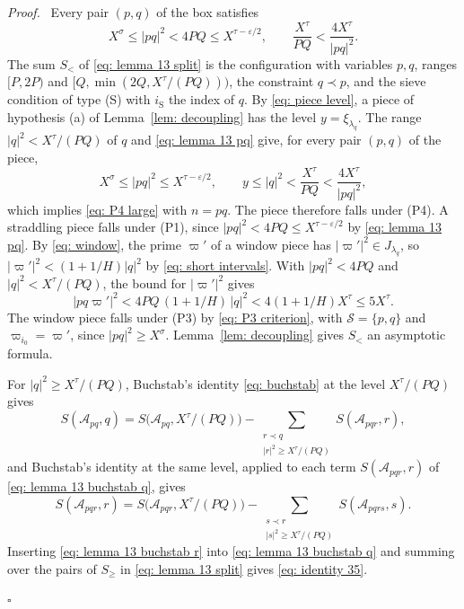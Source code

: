 \documentclass{article}
\numberwithin{equation}{section}
\newenvironment{proof}[1][Proof]{\par\medskip\noindent\textit{#1.}\ }{\hfill$\square$\par\medskip}
\newcommand{\Le}{\leqslant}
\newcommand{\Ge}{\geqslant}
\begin{document}
\begin{proof}
Every pair $(p, q)$ of the box satisfies
\begin{equation}
\label{eq: lemma 13 pq}
X^{\sigma} \Le |pq|^2 < 4PQ \Le X^{\tau - \varepsilon/2}, \qquad \frac{X^{\tau}}{PQ} < \frac{4X^{\tau}}{|pq|^2}.
\end{equation}
The sum $S_<$ of \eqref{eq: lemma 13 split} is the configuration with variables $p, q$, ranges $[P, 2P)$ and $[Q, \min(2Q, X^{\tau}/(PQ)))$, the constraint $q \prec p$, and the sieve condition of type (S) with $i_{\mathrm{S}}$ the index of $q$. By \eqref{eq: piece level}, a piece of hypothesis (a) of Lemma~\ref{lem: decoupling} has the level $y = \xi_{\lambda_q}$. The range $|q|^2 < X^{\tau}/(PQ)$ of $q$ and \eqref{eq: lemma 13 pq} give, for every pair $(p, q)$ of the piece,
\begin{equation*}
X^{\sigma} \Le |pq|^2 \Le X^{\tau - \varepsilon/2}, \qquad y \Le |q|^2 < \frac{X^{\tau}}{PQ} < \frac{4X^{\tau}}{|pq|^2},
\end{equation*}
which implies \eqref{eq: P4 large} with $n = pq$. The piece therefore falls under (P4). A straddling piece falls under (P1), since $|pq|^2 < 4PQ \Le X^{\tau - \varepsilon/2}$ by \eqref{eq: lemma 13 pq}. By \eqref{eq: window}, the prime $\varpi'$ of a window piece has $|\varpi'|^2 \in J_{\lambda_q}$, so $|\varpi'|^2 < (1 + 1/H)|q|^2$ by \eqref{eq: short intervals}. With $|pq|^2 < 4PQ$ and $|q|^2 < X^{\tau}/(PQ)$, the bound for $|\varpi'|^2$ gives
\begin{equation*}
|pq\varpi'|^2 < 4PQ\, (1 + 1/H)\, |q|^2 < 4(1 + 1/H) X^{\tau} \Le 5X^{\tau}.
\end{equation*}
The window piece falls under (P3) by \eqref{eq: P3 criterion}, with $\mathcal{S} = \{p, q\}$ and $\varpi_{i_0} = \varpi'$, since $|pq|^2 \Ge X^{\sigma}$. Lemma~\ref{lem: decoupling} gives $S_<$ an asymptotic formula.

For $|q|^2 \Ge X^{\tau}/(PQ)$, Buchstab's identity \eqref{eq: buchstab} at the level $X^{\tau}/(PQ)$ gives
\begin{equation}
\label{eq: lemma 13 buchstab q}
S(\mathcal{A}_{pq}, q) = S\bigl(\mathcal{A}_{pq}, X^{\tau}/(PQ)\bigr) - \sum_{\substack{r \prec q \\ |r|^2 \Ge X^{\tau}/(PQ)}} S(\mathcal{A}_{pqr}, r),
\end{equation}
and Buchstab's identity at the same level, applied to each term $S(\mathcal{A}_{pqr}, r)$ of \eqref{eq: lemma 13 buchstab q}, gives
\begin{equation}
\label{eq: lemma 13 buchstab r}
S(\mathcal{A}_{pqr}, r) = S\bigl(\mathcal{A}_{pqr}, X^{\tau}/(PQ)\bigr) - \sum_{\substack{s \prec r \\ |s|^2 \Ge X^{\tau}/(PQ)}} S(\mathcal{A}_{pqrs}, s).
\end{equation}
Inserting \eqref{eq: lemma 13 buchstab r} into \eqref{eq: lemma 13 buchstab q} and summing over the pairs of $S_\Ge$ in \eqref{eq: lemma 13 split} gives \eqref{eq: identity 35}.


\end{proof}
\end{document}
